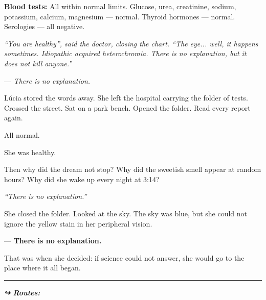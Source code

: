 \noindent \textbf{Blood tests:} All within normal limits. Glucose, urea, creatinine, sodium, potassium, calcium, magnesium --- normal. Thyroid hormones --- normal. Serologies --- all negative.

\noindent \textit{\textquotedblleft{}You are healthy\textquotedblright{}\textit{, said the doctor, closing the chart. }\textquotedblleft{}The eye... well, it happens sometimes. Idiopathic acquired heterochromia. There is no explanation, but it does not kill anyone.\textquotedblright{}}

\noindent --- \textit{There is no explanation.}

\noindent Lúcia stored the words away. She left the hospital carrying the folder of tests. Crossed the street. Sat on a park bench. Opened the folder. Read every report again.

\noindent All normal.

\noindent She was healthy.

\noindent Then why did the dream not stop? Why did the sweetish smell appear at random hours? Why did she wake up every night at 3:14?

\noindent \textit{\textquotedblleft{}There is no explanation.\textquotedblright{}}

\noindent She closed the folder. Looked at the sky. The sky was blue, but she could not ignore the yellow stain in her peripheral vision.

\noindent --- \textbf{There is no explanation.}

\noindent That was when she decided: if science could not answer, she would go to the place where it all began.

\vspace{0.5em}\noindent\rule{\textwidth}{0.5pt}\vspace{0.5em}

\vspace{0.5em}
\noindent\textit{\textbf{↪ Routes:}  \rotasep {}}
